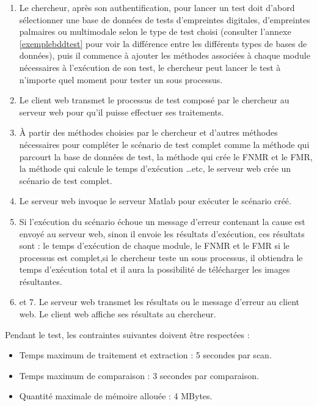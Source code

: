 \begin{enumerate}
	\item Le chercheur, après son authentification, pour lancer un test doit d’abord sélectionner une base de données de tests d'empreintes digitales, d'empreintes palmaires ou multimodale selon le type de test choisi (consulter l’annexe \ref{exemplebddtest} pour voir la différence entre les différents types de bases de données), puis il commence à ajouter les méthodes associées à chaque module nécessaires à l'exécution de son test, le chercheur peut lancer le test à n’importe quel moment pour tester un sous processus. 

	\item Le client web transmet le processus de test composé par le chercheur au serveur web pour qu’il puisse effectuer ses traitements.
	\item À partir des méthodes choisies par le chercheur et d’autres méthodes nécessaires pour compléter le scénario de test complet comme la méthode qui parcourt la base de données de test, la méthode qui crée le FNMR et le FMR, la méthode qui calcule le temps d’exécution …etc, le serveur web crée un scénario de test complet.

	\item Le serveur web invoque le serveur Matlab pour exécuter le scénario créé.
	\item Si l’exécution du scénario échoue un message d’erreur contenant la cause est envoyé au serveur web, sinon il envoie les résultats d’exécution, ces résultats sont : le temps d’exécution de chaque module, le FNMR et le FMR si le processus est complet,si le chercheur teste un sous processus, il obtiendra le temps d’exécution total et il aura la possibilité de télécharger les images résultantes.
	\item et 7. Le serveur web transmet les résultats ou le message d’erreur au client web. Le client web affiche ses résultats au chercheur.
\end{enumerate}
Pendant le test, les contraintes suivantes doivent être respectées :
\begin{itemize}
\item Temps maximum de traitement et extraction : 5 secondes par scan.
\item Temps maximum de comparaison : 3 secondes par comparaison.
\item Quantité maximale de mémoire allouée : 4 MBytes.
\end{itemize} 

